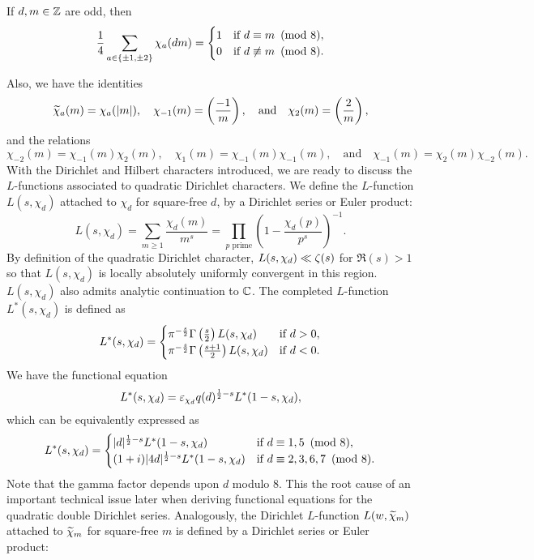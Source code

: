 \documentclass[12pt,reqno,oneside]{amsart}
\begin{document}
    \begin{theorem}
        If $d,m \in \mathbb{Z}$ are odd, then
        \[
            \frac{1}{4}\sum_{a \in \{\pm1,\pm2\}}\chi_{a}(dm) = \begin{cases} 1 & \text{if $d \equiv m \ \left(\text{mod }8\right)$}, \\ 0 & \text{if $d \not\equiv m \ \left(\text{mod }8\right)$}. \end{cases}
        \]
    \end{theorem}

    Also, we have the identities
    \[
        \widetilde{\chi}_{a}(m) = \chi_{a}(|m|), \quad \chi_{-1}(m) = \left(\frac{-1}{m}\right), \quad \text{and} \quad \chi_{2}(m) = \left(\frac{2}{m}\right),
    \]
    and the relations
    \[
        \chi_{-2}(m) = \chi_{-1}(m)\chi_{2}(m), \quad \chi_{1}(m) = \chi_{-1}(m)\chi_{-1}(m), \quad \text{and} \quad \chi_{-1}(m) = \chi_{2}(m)\chi_{-2}(m).
    \]
    With the Dirichlet and Hilbert characters introduced, we are ready to discuss the $L$-functions associated to quadratic Dirichlet characters. We define the $L$-function $L(s,\chi_{d})$ attached to $\chi_{d}$ for square-free $d$, by a Dirichlet series or Euler product:
    \[
        L(s,\chi_{d}) = \sum_{m \ge 1}\frac{\chi_{d}(m)}{m^{s}} = \prod_{p \text{ prime}}\left(1-\frac{\chi_{d}(p)}{p^{s}}\right)^{-1}.
    \]
    By definition of the quadratic Dirichlet character, $L(s,\chi_{d}) \ll \zeta(s)$ for $\Re(s) > 1$ so that $L(s,\chi_{d})$ is locally absolutely uniformly convergent in this region. $L(s,\chi_{d})$ also admits analytic continuation to $\mathbb{C}$. The completed $L$-function $L^{\ast}(s,\chi_{d})$ is defined as
    \[
        L^{\ast}(s,\chi_{d}) = \begin{cases} \pi^{-\frac{s}{2}}\Gamma\left(\frac{s}{2}\right)L(s,\chi_{d}) & \text{if $d > 0$}, \\ \pi^{-\frac{s}{2}}\Gamma\left(\frac{s+1}{2}\right)L(s,\chi_{d}) & \text{if $d < 0$}. \end{cases}
    \]
    We have the functional equation
    \[
        L^{\ast}(s,\chi_{d}) = \varepsilon_{\chi_{d}}q(d)^{\frac{1}{2}-s}L^{\ast}(1-s,\chi_{d}),
    \]
    which can be equivalently expressed as
    \[
        L^{\ast}(s,\chi_{d}) = \begin{cases} |d|^{\frac{1}{2}-s}L^{\ast}(1-s,\chi_{d}) & \text{if $d \equiv 1,5 \ \left(\text{mod }8\right)$}, \\ (1+i)|4d|^{\frac{1}{2}-s}L^{\ast}(1-s,\chi_{d}) & \text{if $d \equiv 2,3,6,7 \ \left(\text{mod }8\right)$}. \end{cases}
    \]
    Note that the gamma factor depends upon $d$ modulo $8$. This the root cause of an important technical issue later when deriving functional equations for the quadratic double Dirichlet series. Analogously, the Dirichlet $L$-function $L(w,\widetilde{\chi}_{m})$ attached to $\widetilde{\chi}_{m}$ for square-free $m$ is defined by a Dirichlet series or Euler product:
\end{document}
